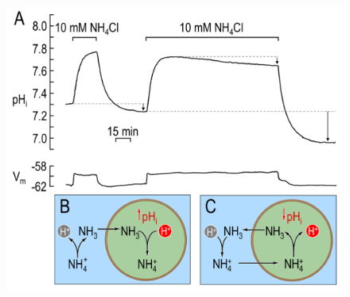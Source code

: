 \documentclass[fleqn,10pt]{physiome}
\begin{document}
\begin{figure}
\centering
\includegraphics[scale=0.25]{Figure 2.png}

\end{figure}
\end{document}
